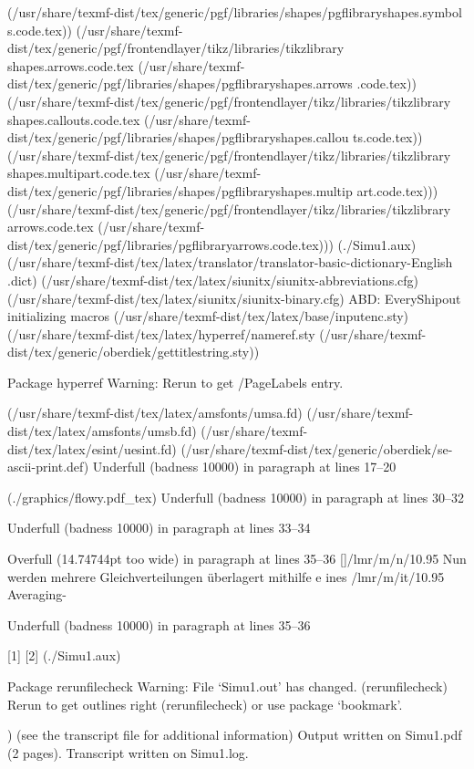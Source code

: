 (/usr/share/texmf-dist/tex/generic/pgf/libraries/shapes/pgflibraryshapes.symbol
s.code.tex))
(/usr/share/texmf-dist/tex/generic/pgf/frontendlayer/tikz/libraries/tikzlibrary
shapes.arrows.code.tex
(/usr/share/texmf-dist/tex/generic/pgf/libraries/shapes/pgflibraryshapes.arrows
.code.tex))
(/usr/share/texmf-dist/tex/generic/pgf/frontendlayer/tikz/libraries/tikzlibrary
shapes.callouts.code.tex
(/usr/share/texmf-dist/tex/generic/pgf/libraries/shapes/pgflibraryshapes.callou
ts.code.tex))
(/usr/share/texmf-dist/tex/generic/pgf/frontendlayer/tikz/libraries/tikzlibrary
shapes.multipart.code.tex
(/usr/share/texmf-dist/tex/generic/pgf/libraries/shapes/pgflibraryshapes.multip
art.code.tex)))
(/usr/share/texmf-dist/tex/generic/pgf/frontendlayer/tikz/libraries/tikzlibrary
arrows.code.tex
(/usr/share/texmf-dist/tex/generic/pgf/libraries/pgflibraryarrows.code.tex)))
(./Simu1.aux)
(/usr/share/texmf-dist/tex/latex/translator/translator-basic-dictionary-English
.dict) (/usr/share/texmf-dist/tex/latex/siunitx/siunitx-abbreviations.cfg)
(/usr/share/texmf-dist/tex/latex/siunitx/siunitx-binary.cfg)
ABD: EveryShipout initializing macros
(/usr/share/texmf-dist/tex/latex/base/inputenc.sty)
(/usr/share/texmf-dist/tex/latex/hyperref/nameref.sty
(/usr/share/texmf-dist/tex/generic/oberdiek/gettitlestring.sty))

Package hyperref Warning: Rerun to get /PageLabels entry.

(/usr/share/texmf-dist/tex/latex/amsfonts/umsa.fd)
(/usr/share/texmf-dist/tex/latex/amsfonts/umsb.fd)
(/usr/share/texmf-dist/tex/latex/esint/uesint.fd)
(/usr/share/texmf-dist/tex/generic/oberdiek/se-ascii-print.def)
Underfull \hbox (badness 10000) in paragraph at lines 17--20

(./graphics/flowy.pdf_tex)
Underfull \hbox (badness 10000) in paragraph at lines 30--32


Underfull \hbox (badness 10000) in paragraph at lines 33--34


Overfull \hbox (14.74744pt too wide) in paragraph at lines 35--36
[]\TU/lmr/m/n/10.95 Nun werden mehrere Gleichverteilungen überlagert mithilfe e
ines \TU/lmr/m/it/10.95 Averaging-

Underfull \hbox (badness 10000) in paragraph at lines 35--36

[1] [2] (./Simu1.aux)

Package rerunfilecheck Warning: File `Simu1.out' has changed.
(rerunfilecheck)                Rerun to get outlines right
(rerunfilecheck)                or use package `bookmark'.

 )
(see the transcript file for additional information)
Output written on Simu1.pdf (2 pages).
Transcript written on Simu1.log.
